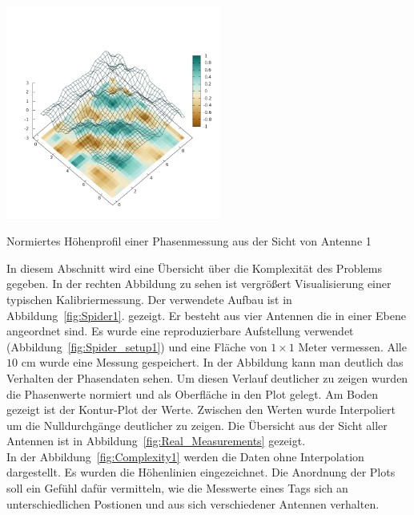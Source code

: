 %
\begin{floatingfigure}[hr!]{6cm}
 \centering
         \includegraphics[width=7cm]{img/Plate0_A1.png}
         \caption[Profil einer Phasenmessung]{Normiertes Höhenprofil einer Phasenmessung aus der Sicht von Antenne 1 }
         \label{fig:Plate0_A1_}
\end{floatingfigure}
%
In diesem Abschnitt wird eine Übersicht über die Komplexität des Problems gegeben. In der rechten Abbildung zu sehen ist vergrößert Visualisierung einer typischen Kalibriermessung. Der verwendete Aufbau ist in Abbildung~\ref{fig:Spider1}. gezeigt. Er besteht aus vier Antennen die in einer Ebene angeordnet sind. Es wurde eine reproduzierbare Aufstellung verwendet (Abbildung~\ref{fig:Spider_setup1}) und eine Fläche von $1\times1$ Meter vermessen. Alle $10$ cm wurde eine Messung gespeichert. In der Abbildung kann man deutlich das Verhalten der Phasendaten sehen. Um diesen Verlauf deutlicher zu zeigen wurden die Phasenwerte normiert und als Oberfläche in den Plot gelegt. Am Boden gezeigt ist der Kontur-Plot der Werte. Zwischen den Werten wurde Interpoliert um die Nulldurchgänge deutlicher zu zeigen. Die Übersicht aus der Sicht aller Antennen ist in Abbildung~\ref{fig:Real_Measurements} gezeigt.\\
%

In der Abbildung~\ref{fig:Complexity1} werden die Daten ohne Interpolation dargestellt. Es wurden die Höhenlinien eingezeichnet. Die Anordnung der Plots soll ein Gefühl dafür vermitteln, wie die Messwerte eines Tags sich an unterschiedlichen Postionen und aus sich verschiedener Antennen verhalten.\\
%

